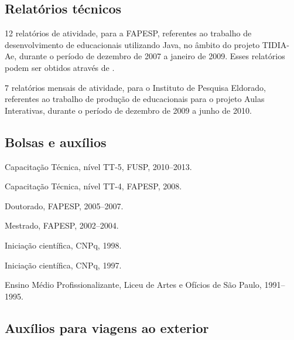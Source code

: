 \subsection{Relatórios técnicos}

\begin{compactitem}
  \item 12 relatórios de atividade, para a FAPESP, referentes ao trabalho de desenvolvimento de  educacionais utilizando Java, no âmbito do projeto TIDIA-Ae, durante o período de dezembro de 2007 a janeiro de 2009. Esses relatórios podem ser obtidos através de \cite{irpagnossin-stoa}.
  \item 7 relatórios mensais de atividade, para o Instituto de Pesquisa Eldorado, referentes ao trabalho de produção de  educacionais para o projeto Aulas Interativas, durante o período de dezembro de 2009 a junho de 2010.
\end{compactitem}

\subsection{Bolsas e auxílios}

\begin{compactitem}
  \item Capacitação Técnica, nível TT-5, FUSP, 2010--2013.
  \item Capacitação Técnica, nível TT-4, FAPESP, 2008.
  \item Doutorado, FAPESP, 2005--2007.
  \item Mestrado, FAPESP, 2002--2004.
  \item Iniciação científica, CNPq, 1998.
  \item Iniciação científica, CNPq, 1997.
  \item Ensino Médio Profissionalizante, Liceu de Artes e Ofícios de São Paulo, 1991--1995.
\end{compactitem}

\subsection{Auxílios para viagens ao exterior}

